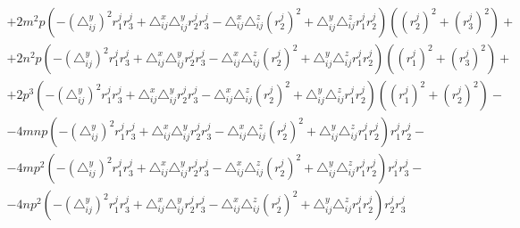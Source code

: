 $$\begin{gathered}
	+ 2 m^2 p \left( - \left( \triangle_{ij}^y\right)^2 r_1^j r_3^j +  \triangle_{ij}^x \triangle_{ij}^y r_2^j r_3^j -  \triangle_{ij}^x  \triangle_{ij}^z (r_2^j)^2 +  \triangle_{ij}^y  \triangle_{ij}^z r_1^j r_2^j \right) \left((r_2^j)^2 + (r_3^j)^2\right) + \\
	+ 2 n^2 p \left( - \left( \triangle_{ij}^y\right)^2 r_1^j r_3^j +  \triangle_{ij}^x \triangle_{ij}^y r_2^j r_3^j -  \triangle_{ij}^x  \triangle_{ij}^z (r_2^j)^2 +  \triangle_{ij}^y  \triangle_{ij}^z r_1^j r_2^j \right) \left((r_1^j)^2 + (r_3^j)^2\right) + \\
	+ 2 p^3 \left( - \left( \triangle_{ij}^y\right)^2 r_1^j r_3^j +  \triangle_{ij}^x \triangle_{ij}^y r_2^j r_3^j -  \triangle_{ij}^x  \triangle_{ij}^z (r_2^j)^2 +  \triangle_{ij}^y  \triangle_{ij}^z r_1^j r_2^j \right) \left((r_1^j)^2 + (r_2^j)^2\right) - \\
	- 4 m n p \left( - \left( \triangle_{ij}^y\right)^2 r_1^j r_3^j +  \triangle_{ij}^x \triangle_{ij}^y r_2^j r_3^j -  \triangle_{ij}^x  \triangle_{ij}^z (r_2^j)^2 +  \triangle_{ij}^y  \triangle_{ij}^z r_1^j r_2^j \right) r_1^j r_2^j - \\
	-4 m p^2 \left( - \left( \triangle_{ij}^y\right)^2 r_1^j r_3^j +  \triangle_{ij}^x \triangle_{ij}^y r_2^j r_3^j -  \triangle_{ij}^x  \triangle_{ij}^z (r_2^j)^2 +  \triangle_{ij}^y  \triangle_{ij}^z r_1^j r_2^j \right) r_1^j r_3^j - \\
	- 4 n p^2 \left( - \left( \triangle_{ij}^y\right)^2 r_1^j r_3^j +  \triangle_{ij}^x \triangle_{ij}^y r_2^j r_3^j -  \triangle_{ij}^x  \triangle_{ij}^z (r_2^j)^2 +  \triangle_{ij}^y  \triangle_{ij}^z r_1^j r_2^j \right) r_2^j r_3^j
\end{gathered}$$

